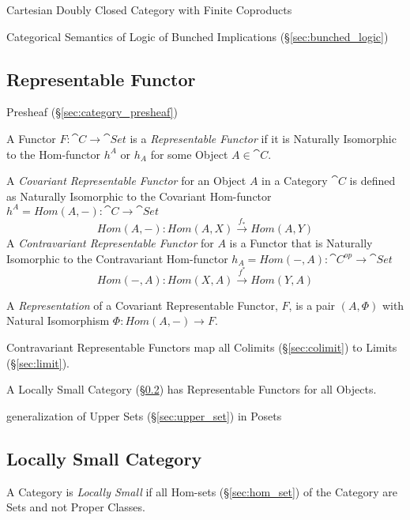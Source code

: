 Cartesian Doubly Closed Category with Finite Coproducts

Categorical Semantics of Logic of Bunched Implications
(\S\ref{sec:bunched_logic})



\subsection{Representable Functor}\label{sec:representable_functor}

Presheaf (\S\ref{sec:category_presheaf})

A Functor $F : \cat{C} \rightarrow \cat{Set}$ is a
\emph{Representable Functor} if it is Naturally Isomorphic to the
Hom-functor $h^A$ or $h_A$ for some Object $A \in \cat{C}$.

A \emph{Covariant Representable Functor} for an Object $A$ in a
Category $\cat{C}$ is defined as Naturally Isomorphic to the
Covariant Hom-functor $h^A = Hom(A,-) : \cat{C} \rightarrow
\cat{Set}$
\[
  Hom(A,-) : Hom(A,X) \xrightarrow{f_*} Hom(A,Y)
\]
A \emph{Contravariant Representable Functor} for $A$ is a Functor that
is Naturally Isomorphic to the Contravariant Hom-functor $h_A =
Hom(-,A) : \cat{C^{op}} \rightarrow \cat{Set}$
\[
  Hom(-,A) : Hom(X,A) \xrightarrow{f^*} Hom(Y,A)
\]

A \emph{Representation} of a Covariant Representable Functor, $F$, is
a pair $(A, \Phi)$ with Natural Isomorphism $\Phi : Hom(A,-)
\rightarrow F$.

Contravariant Representable Functors map all Colimits
(\S\ref{sec:colimit}) to Limits (\S\ref{sec:limit}).

A Locally Small Category (\S\ref{sec:locally_small}) has Representable
Functors for all Objects.

generalization of Upper Sets (\S\ref{sec:upper_set}) in Posets



\subsection{Locally Small Category}\label{sec:locally_small}

A Category is \emph{Locally Small} if all Hom-sets
(\S\ref{sec:hom_set}) of the Category are Sets and not Proper Classes.

